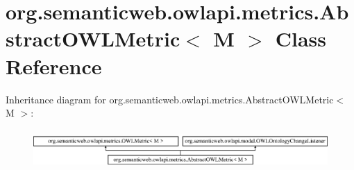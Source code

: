 \hypertarget{classorg_1_1semanticweb_1_1owlapi_1_1metrics_1_1_abstract_o_w_l_metric_3_01_m_01_4}{\section{org.\-semanticweb.\-owlapi.\-metrics.\-Abstract\-O\-W\-L\-Metric$<$ M $>$ Class Reference}
\label{classorg_1_1semanticweb_1_1owlapi_1_1metrics_1_1_abstract_o_w_l_metric_3_01_m_01_4}
}
Inheritance diagram for org.\-semanticweb.\-owlapi.\-metrics.\-Abstract\-O\-W\-L\-Metric$<$ M $>$\-:\begin{figure}[H]
\begin{center}
\leavevmode
\includegraphics[height=1.538461cm]{classorg_1_1semanticweb_1_1owlapi_1_1metrics_1_1_abstract_o_w_l_metric_3_01_m_01_4}
\end{center}
\end{figure}
